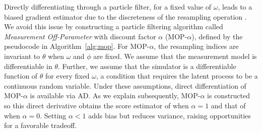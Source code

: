 \documentclass[11pt]{article}
\begin{document}
Directly differentiating through a particle filter, for a fixed value of $\omega$, leads to a biased gradient estimator due to the discreteness of the resampling operation \cite{corenflos21}.
We avoid this issue by constructing a particle filtering algorithm called {\it Measurement Off-Parameter} with discount factor $\alpha$ (MOP-$\alpha$), defined by the pseudocode in Algorithm~\ref{alg:mop}.
For MOP-$\alpha$, the resampling indices are invariant to $\theta$ when $\omega$ and $\phi$ are fixed.
We assume that the measurement model is differentiable in $\theta$.
Further, we assume that the simulator is a differentiable function of $\theta$ for every fixed $\omega$, a condition that requires the latent process to be a continuous random variable.
Under these assumptions, direct differentiation of MOP-$\alpha$ is available via AD.
As we explain subsequently, MOP-$\alpha$ is constructed so this direct derivative obtains the score estimator of  \cite{poyiadjis11, scibior21} when $\alpha=1$ and that of \cite{naesseth18} when $\alpha=0$.
Setting $\alpha<1$ adds bias but reduces variance, raising opportunities for a favorable tradeoff.
\end{document}
